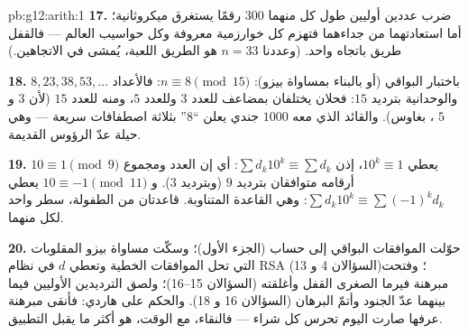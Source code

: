 \begin{solution}{pb:g12:arith:1}
\textbf{17.} ضرب عددين أوليين طول كل منهما $300$ رقمًا يستغرق
ميكروثانية؛ أما استعادتهما من جداءهما فتهزم كل
خوارزمية معروفة وكل حواسيب العالم --- فالقفل
طريق باتجاه واحد. (وعددنا $n = 33$ هو الطريق  اللعبة،
يُمشى في الاتجاهين.)

\textbf{18.} باختبار البواقي (أو بالبناء بمساواة بيزو):
$n \equiv 8 \pmod{15}$: فالأعداد $8, 23, 38, 53, \dots$
والوحدانية بترديد $15$: فحلان يختلفان بمضاعف
للعدد $3$ وللعدد $5$، ومنه للعدد $15$ (لأن $3$ و $5$ ، بغاوس).
والقائد الذي معه $1000$ جندي يعلن ``$8$'' بثلاثة
اصطفافات سريعة --- وهي حيلة عدّ الرؤوس القديمة.

\textbf{19.} $10 \equiv 1 \pmod 9$ يعطي $10^k \equiv 1$، إذن
$\sum d_k 10^k \equiv \sum d_k$: أي إن العدد ومجموع أرقامه
متوافقان بترديد $9$ (وبترديد $3$). و
$10 \equiv -1 \pmod{11}$ يعطي
$\sum d_k 10^k \equiv \sum (-1)^k d_k$: وهي القاعدة المتناوبة.
قاعدتان من الطفولة، سطر واحد لكل منهما.

\textbf{20.} حوّلت الموافقات البواقي إلى حساب
(الجزء الأول)؛ وسكّت مساواة بيزو المقلوبات التي تحل الموافقات
الخطية وتعطي $d$ في نظام RSA (السؤالان 4 و 13)؛ وفتحت مبرهنة فيرما
الصغرى القفل وأغلقته (السؤالان 15--16)؛ ولصق الترديدين الأوليين
فيما بينهما عدّ الجنود وأتمّ البرهان
(السؤالان 16 و 18). والحكم على هاردي: فأنقى مبرهنة
عرفها صارت اليوم تحرس كل شراء --- فالنقاء، مع الوقت،
هو أكثر ما يقبل التطبيق.
\end{solution}
